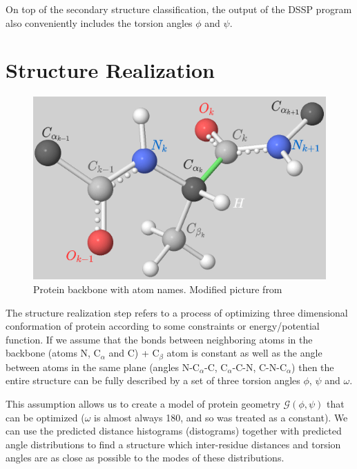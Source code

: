 On top of the secondary structure classification, the output of the DSSP program also conveniently includes the torsion angles $\phi$ and $\psi$.
        


\section{Structure Realization}

\begin{figure}
    \centering
    \includegraphics[scale=0.5]{imgs_tomas/backbone.png}
    \caption{Protein backbone with atom names. Modified picture from \cite{ramachandran}}
    \label{fig:backbone}
\end{figure}

The structure realization step refers to a process of optimizing three dimensional conformation of protein according to some constraints or energy/potential function. If we assume that the bonds between neighboring atoms in the backbone (atoms N, C$_\alpha$ and C) + C$_\beta$ atom is constant as well as the angle between atoms in the same plane (angles N-C$_{\alpha}$-C, C$_{\alpha}$-C-N, C-N-C$_{\alpha}$) then the entire structure can be fully described by a set of three torsion angles $\phi$, $\psi$ and $\omega$.

This assumption allows us to create a model of protein geometry $\mathcal{G}(\phi, \psi)$ that can be optimized ($\omega$ is almost always 180\degree, and so was treated as a constant). We can use the predicted distance histograms (distograms) together with predicted angle distributions to find a structure which inter-residue distances and torsion angles are as close as possible to the modes of these distributions.


